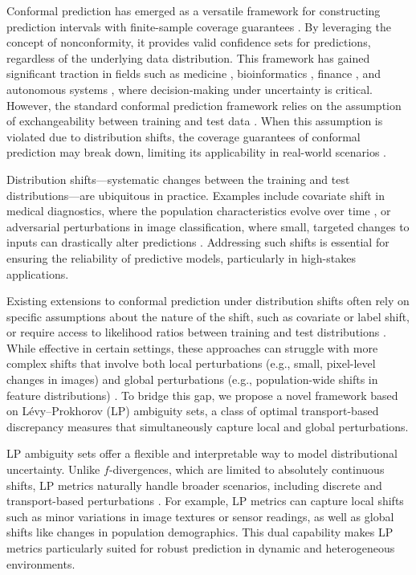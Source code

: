\documentclass[11pt,a4paper]{article}
\begin{document}
Conformal prediction has emerged as a versatile framework for constructing prediction intervals with finite-sample coverage guarantees \cite{papadopoulos2002inductive, Vovk_2005, angelopoulos2024theoretical}. By leveraging the concept of nonconformity, it provides valid confidence sets for predictions, regardless of the underlying data distribution. This framework has gained significant traction in fields such as medicine \cite{lu2022fair, vazquez2022conformal}, bioinformatics \cite{fannjiang2022conformal}, finance \cite{wisniewski2020application}, and autonomous systems \cite{lindemann2023safe, lindemann2023conformal}, where decision-making under uncertainty is critical. However, the standard conformal prediction framework relies on the assumption of exchangeability between training and test data \cite{Barber_2023}. When this assumption is violated due to distribution shifts, the coverage guarantees of conformal prediction may break down, limiting its applicability in real-world scenarios \cite{tibshirani2019conformal}.

Distribution shifts—systematic changes between the training and test distributions—are ubiquitous in practice. Examples include covariate shift in medical diagnostics, where the population characteristics evolve over time \cite{rahmani2023assessing}, or adversarial perturbations in image classification, where small, targeted changes to inputs can drastically alter predictions \cite{moosavi2017universal}. Addressing such shifts is essential for ensuring the reliability of predictive models, particularly in high-stakes applications.

Existing extensions to conformal prediction under distribution shifts often rely on specific assumptions about the nature of the shift, such as covariate or label shift, or require access to likelihood ratios between training and test distributions \cite{tibshirani2019conformal, Podkopaev_2021}. While effective in certain settings, these approaches can struggle with more complex shifts that involve both local perturbations (e.g., small, pixel-level changes in images) and global perturbations (e.g., population-wide shifts in feature distributions) \cite{Beery_2020}. To bridge this gap, we propose a novel framework based on Lévy–Prokhorov (LP) ambiguity sets, a class of optimal transport-based discrepancy measures that simultaneously capture local and global perturbations.

LP ambiguity sets offer a flexible and interpretable way to model distributional uncertainty. Unlike $f$-divergences, which are limited to absolutely continuous shifts, LP metrics naturally handle broader scenarios, including discrete and transport-based perturbations \cite{Bennouna_2023}. For example, LP metrics can capture local shifts such as minor variations in image textures or sensor readings, as well as global shifts like changes in population demographics. This dual capability makes LP metrics particularly suited for robust prediction in dynamic and heterogeneous environments.
\end{document}
